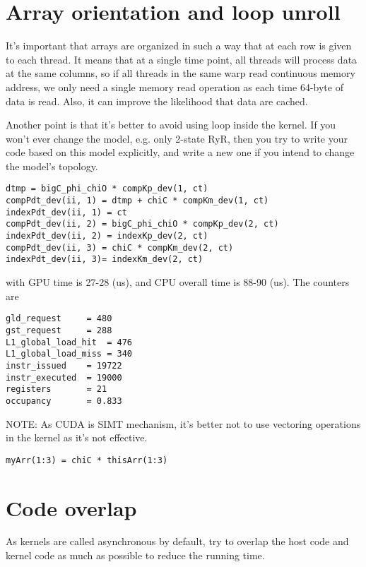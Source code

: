 \section{Array orientation and loop unroll}
\label{sec:array-orient-loop}

It's important that arrays are organized in such a way that at each
row is given to each thread. It means that at a single time point, all
threads will process data at the same columns, so if all threads in
the same warp read continuous memory address, we only need a single
memory read operation as each time 64-byte of data is read. Also, it
can improve the likelihood that data are cached.

Another point is that it's better to  avoid using loop inside the
kernel. If you won't ever change the model, e.g. only 2-state RyR,
then you try to write your code based on this model explicitly, and
write a new one if you intend to change the model's topology. 
\begin{verbatim}
dtmp = bigC_phi_chiO * compKp_dev(1, ct)
compPdt_dev(ii, 1) = dtmp + chiC * compKm_dev(1, ct)
indexPdt_dev(ii, 1) = ct
compPdt_dev(ii, 2) = bigC_phi_chiO * compKp_dev(2, ct)
indexPdt_dev(ii, 2) = indexKp_dev(2, ct)
compPdt_dev(ii, 3) = chiC * compKm_dev(2, ct)
indexPdt_dev(ii, 3)= indexKm_dev(2, ct)
\end{verbatim}
with GPU time is 27-28 (us), and CPU overall time is 88-90 (us). The
counters are
\begin{verbatim}
gld_request     = 480
gst_request     = 288
L1_global_load_hit  = 476
L1_global_load_miss = 340
instr_issued    = 19722
instr_executed  = 19000
registers       = 21
occupancy       = 0.833
\end{verbatim}

NOTE: As CUDA is SIMT mechanism, it's better not to use vectoring
operations in the kernel as it's not effective. 
\begin{verbatim}
myArr(1:3) = chiC * thisArr(1:3)
\end{verbatim}


\section{Code overlap}
\label{sec:code-overlap}

As kernels are called asynchronous by default, try to overlap the host
code and kernel code as much as possible to reduce the running time.

